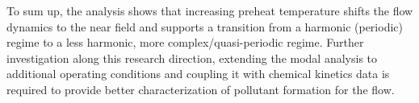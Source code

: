 To sum up, the analysis shows that increasing preheat temperature shifts the flow dynamics to the near field and supports a transition from a harmonic (periodic) regime to a less harmonic, more complex/quasi-periodic regime.
 Further investigation along this research direction, extending the modal analysis to additional operating conditions and coupling it with chemical kinetics data is required to provide better characterization of pollutant formation for the flow.
